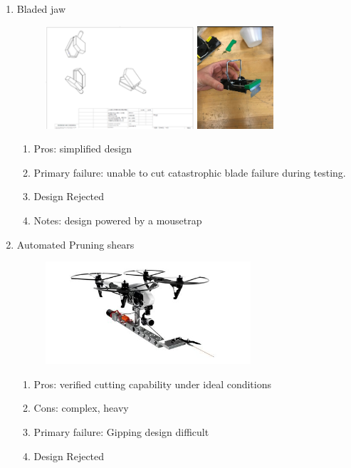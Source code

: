 \begin{enumerate}
\item Bladed jaw
\begin{figure}
\begin{center}
\includegraphics[height=1.5in]{figures/robotarmmech2a.png}
\includegraphics[height=1.5in]{figures/robotarmmech2b.png}
\end{center}
\end{figure}
\begin{enumerate}
\item Pros: simplified design
\item Primary failure: unable to cut catastrophic blade failure during testing.
\item Design Rejected
\item Notes: design powered by a mousetrap
\end{enumerate} 

\item Automated Pruning shears
\begin{figure}
\begin{center}
\includegraphics[height=1.5in]{figures/robotarmmech3.png}
\end{center}
\end{figure}
\begin{enumerate}
\item Pros: verified cutting capability under ideal conditions
\item Cons: complex, heavy
\item Primary failure: Gipping design difficult
\item Design Rejected
\end{enumerate}


\end{enumerate}
